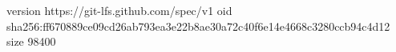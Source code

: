 version https://git-lfs.github.com/spec/v1
oid sha256:ff670889ce09cd26ab793ea3e22b8ae30a72c40f6e14e4668c3280ccb94c4d12
size 98400
